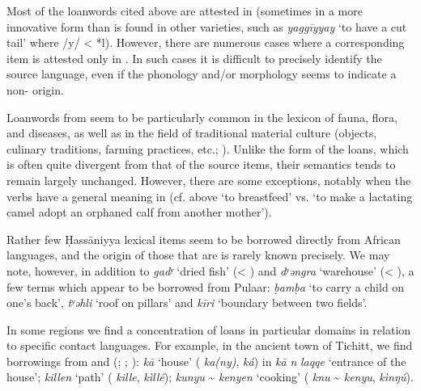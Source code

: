 \documentclass[output=paper]{langsci/langscibook}
\begin{document}
Most of the {loanwords} cited above are attested in  (sometimes in a more innovative form than is found in other  varieties, such as \textit{yaggīyyay} ‘to have a cut tail’ where /y/ < *l). However, there are numerous cases where a corresponding  item is attested only in . In such cases it is difficult to precisely identify the {source language}, even if the phonology and/or morphology seems to indicate a non- origin. 

Loanwords from  seem to be particularly common in the lexicon of fauna, flora, and diseases, as well as in the field of traditional material culture (objects, culinary traditions, farming practices, etc.; \citealt{Taine-Cheikh2010lexiques,Taine-Cheikh2014}). Unlike the form of the loans, which is often quite divergent from that of the source items, their semantics tends to remain largely unchanged. However, there are some exceptions, notably when the verbs have a general meaning in  (cf. above `to breastfeed' vs. `to make a lactating camel adopt an orphaned calf from another mother'). 


Rather few Ḥassāniyya lexical items seem to be borrowed directly from African languages, and the origin of those that are is rarely known precisely. We may note, however, in addition to \textit{gadʸ} ‘dried fish’ (< ) and \textit{dʸəngra} ‘warehouse’ (< ), a few terms which appear to be borrowed from Pulaar: \textit{ḅamḅa} ‘to carry a child on one’s back’, \textit{tʸəhli} ‘roof on pillars’ and \textit{kīri} ‘boundary between two fields’.

In some regions we find a concentration of loans in particular domains in relation to specific contact languages. For example, in the ancient town of Tichitt, we find borrowings from  and  (\citealt{Jacques-Meunié1961}; \citealt{Monteil1939}; \citealt{Diagana2013}): \textit{kā} ‘house’ ( \textit{ka(ny)},  \textit{ká}) in \textit{kā} \textit{n} \textit{laqqe} ‘entrance of the house’; \textit{killen} ‘path’ ( \textit{kille},  \textit{kìllé}); \textit{kunyu} \~{} \textit{kenyen} ‘cooking’ ( \textit{knu} \~{} \textit{kenyu},  \textit{kìnŋú}).
\end{document}
